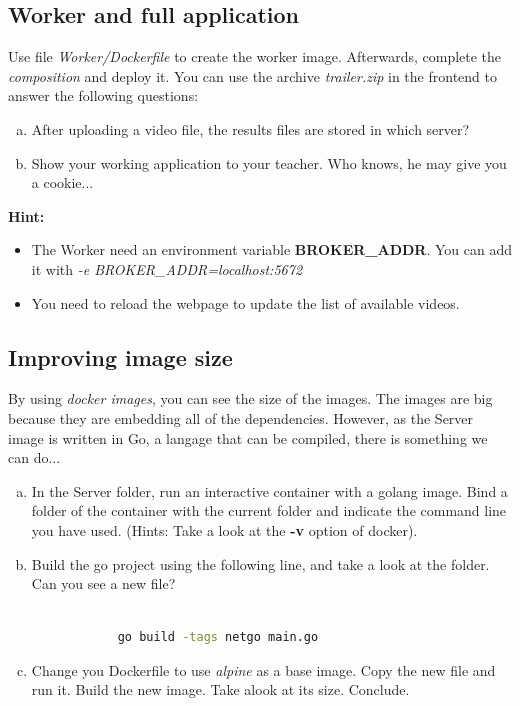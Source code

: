 \documentclass[a4paper,11pt]{exam}
\begin{document}
\subsection{Worker and full application}
	\begin{questions}
	
	\question Use file \textit{Worker/Dockerfile} to create the worker image. Afterwards, complete the \textit{composition} and deploy it. You can use the archive \textit{trailer.zip} in the frontend to answer the following questions:
	
	\begin{enumerate}[(a)] %
		\item After uploading a video file, the results files are stored in which server? 
		\item Show your working application to your teacher. Who knows, he may give you a cookie... 
	\end{enumerate}
	
	\textbf{Hint:}
	\begin{itemize}
	\item The Worker need an environment variable \textbf{BROKER\_ADDR}. You can add it with \textit{-e BROKER\_ADDR=localhost:5672}
	\item You need to reload the webpage to update the list of available videos. 
	\end{itemize}
	\end{questions}


\subsection{Improving image size}	
	\begin{questions}

	\question By using \textit{docker images}, you can see the size of the images. The images are big because they are embedding all of the dependencies. However, as the Server image is written in Go, a langage that can be compiled, there is something we can do...
	
	\begin{enumerate}[(a)] %
		\item In the Server folder, run an interactive container with a golang image. Bind a folder of the container with the current folder and indicate the command line you have used. (Hints: Take a look at the \textbf{-v} option of docker).
		\item Build the go project using the following line, and take a look at the folder. Can you see a new file?

		\begin{lstlisting}[frame=single,language={sh}]  % Start your code-block

			go build -tags netgo main.go

		\end{lstlisting}
		\item Change you Dockerfile to use \textit{alpine} as a base image. Copy the new file and run it. Build the new image. Take alook at its size. Conclude. 
	\end{enumerate}
\end{questions}
\end{document}
